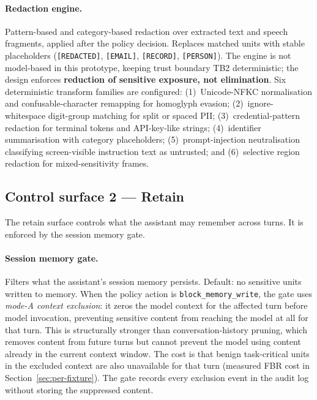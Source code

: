 \documentclass[sn-mathphys-num]{sn-jnl}
\begin{document}
\paragraph{Redaction engine.}
Pattern-based and category-based redaction over extracted text and speech
fragments, applied after the policy decision. Replaces matched units with
stable placeholders (\texttt{[REDACTED]}, \texttt{[EMAIL]}, \texttt{[RECORD]},
\texttt{[PERSON]}). The engine is not model-based in this prototype, keeping
trust boundary TB2 deterministic; the design enforces \textbf{reduction of
sensitive exposure, not elimination}. Six deterministic transform families are
configured: (1)~Unicode-NFKC normalisation and confusable-character remapping
for homoglyph evasion; (2)~ignore-whitespace digit-group matching for split or
spaced PII; (3)~credential-pattern redaction for terminal tokens and
API-key-like strings; (4)~identifier summarisation with category placeholders;
(5)~prompt-injection neutralisation classifying screen-visible instruction text
as untrusted; and (6)~selective region redaction for mixed-sensitivity frames.

\subsection{Control surface 2 --- Retain}\label{sec:retain}

The retain surface controls what the assistant may remember across turns. It is
enforced by the session memory gate.

\paragraph{Session memory gate.}
Filters what the assistant's session memory persists. Default: no sensitive
units written to memory. When the policy action is
\texttt{block\_memory\_write}, the gate uses \textit{mode-A context exclusion}:
it zeros the model context for the affected turn before model invocation,
preventing sensitive content from reaching the model at all for that turn.
This is structurally stronger than conversation-history pruning, which removes
content from future turns but cannot prevent the model using content already in
the current context window. The cost is that benign task-critical units in the
excluded context are also unavailable for that turn (measured FBR cost in
Section~\ref{sec:per-fixture}). The gate records every exclusion event in the
audit log without storing the suppressed content.
\end{document}
